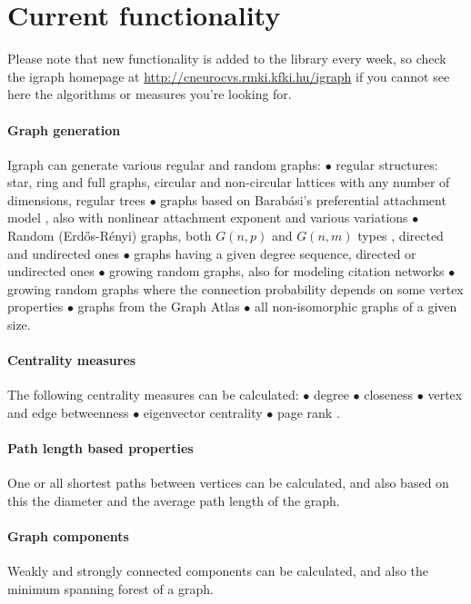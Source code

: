 \documentclass[twoside]{book}%
\begin{document}
\section{Current functionality}

Please note that new functionality is added to the library every
week, so check the igraph homepage at
\url{http://cneurocvs.rmki.kfki.hu/igraph} if you cannot see here the
algorithms or measures you're looking for. 

\paragraph{Graph generation} Igraph can generate various regular and
random graphs: $\bullet$ regular structures: star, ring and full
graphs, circular and non-circular lattices with any number of
dimensions, regular trees $\bullet$ graphs based on Barab\'asi's
preferential attachment model \cite{barabasi99a}, also with nonlinear
attachment exponent and various variations $\bullet$ Random
(Erd\H{o}s-R\'enyi) graphs, both $G(n,p)$ and $G(n,m)$ types
\cite{erdos59}, directed and undirected ones $\bullet$ graphs having a
given degree sequence, directed or undirected ones \cite{newman01}
$\bullet$ growing random graphs, also for modeling citation networks
\cite{callaway01} $\bullet$ growing random graphs where the connection
probability depends on some vertex properties $\bullet$ graphs from
the Graph Atlas \cite{read98} $\bullet$ all non-isomorphic graphs of a
given size. 

\paragraph{Centrality measures} The following centrality measures
\cite{freeman79} can be calculated: $\bullet$ degree $\bullet$
closeness $\bullet$ vertex and edge betweenness $\bullet$ eigenvector
centrality $\bullet$ page rank \cite{page98}.

\paragraph{Path length based properties} One or all shortest paths
between vertices can be calculated, and also based on this the
diameter and the average path length of the graph.

\paragraph{Graph components} Weakly and strongly connected components
can be calculated, and also the minimum spanning forest of a graph.
\end{document}
